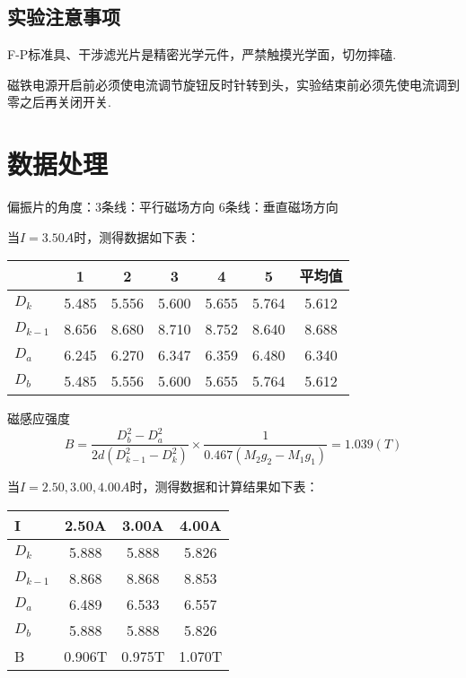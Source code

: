 \documentclass{thureport}
\begin{document}
\subsection{实验注意事项}
\begin{clause}
	\item F-P标准具、干涉滤光片是精密光学元件，严禁触摸光学面，切勿摔磕.
	\item 磁铁电源开启前必须使电流调节旋钮反时针转到头，实验结束前必须先使电流调到零之后再关闭开关.
\end{clause}

\section{数据处理}
偏振片的角度：3条线：平行磁场方向   6条线：垂直磁场方向

当$I=3.50A$时，测得数据如下表：
\begin{table}[htbp]
    \centering
      \begin{tabular}{|l|c|c|c|c|c|c|}
      \hline
            & 1     & 2     & 3     & 4     & 5     & 平均值 \bigstrut\\
      \hline
      $D_k$ & 5.485  & 5.556  & 5.600  & 5.655  & 5.764  & 5.612  \bigstrut\\
      \hline
      $D_{k-1}$ & 8.656  & 8.680  & 8.710  & 8.752  & 8.640  & 8.688  \bigstrut\\
      \hline
      $D_a$ & 6.245  & 6.270  & 6.347  & 6.359  & 6.480  & 6.340  \bigstrut\\
      \hline
      $D_b$ & 5.485  & 5.556  & 5.600  & 5.655  & 5.764  & 5.612  \bigstrut\\
      \hline
      \end{tabular}%
    \label{tab:addlabel}%
  \end{table}%

磁感应强度
$$B=\frac{D_b^2-D_a^2}{2d(D_{k-1}^2-D_k^2)}\times\frac{1}{0.467(M_2g_2-M_1g_1)}=1.039(T)$$
  
当$I=2.50,3.00,4.00A$时，测得数据和计算结果如下表：

\begin{table}[H]
    \centering
      \begin{tabular}{|l|c|c|c|}
      \hline
      I     & 2.50A & 3.00A & 4.00A \bigstrut\\
      \hline
      $D_k$ & 5.888 & 5.888 & 5.826 \bigstrut\\
      \hline
      $D_{k-1}$ & 8.868 & 8.868 & 8.853 \bigstrut\\
      \hline
      $D_a$ & 6.489 & 6.533 & 6.557 \bigstrut\\
      \hline
      $D_b$ & 5.888 & 5.888 & 5.826 \bigstrut\\
      \hline
      B     & 0.906T & 0.975T & 1.070T \bigstrut\\
      \hline
      \end{tabular}%
    \label{tab:addlabel}%
  \end{table}%
\end{document}
